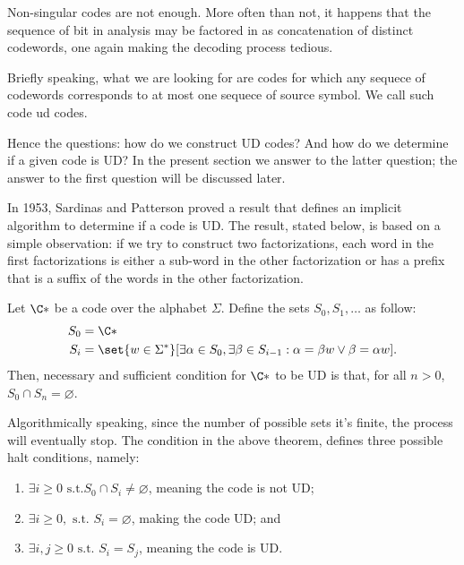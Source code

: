 \documentclass{subfiles}
\begin{document}
    Non-singular codes are not enough. 
        More often than not, it happens that the sequence of bit in analysis may be factored in
        as concatenation of distinct codewords, one again making the decoding process tedious. 

    Briefly speaking, what we are looking for are codes for which any sequece of codewords
        corresponds to at most one sequece of source symbol.
        We call such code \gls{ud} codes.
        
    Hence the questions: how do we construct UD codes?
        And how do we determine if a given code is UD? 
        In the present section we answer to the latter question;
        the answer to the first question will be discussed later.

    In 1953, Sardinas and Patterson proved a result that defines an implicit algorithm 
        to determine if a code is UD. The result, stated below, is based on a simple observation:
        if we try to construct two factorizations, each word in the first factorizations
        is either a sub-word in the other factorization or has a prefix that is a suffix of 
        the words in the other factorization.

    \begin{theorem*}
        Let \(\C*\) be a code over the alphabet \(\Sigma\).
        Define the sets \(S_{0}, S_{1}, \ldots\) as follow:
        \[\begin{aligned}
            S_{0} & = \C* \\ 
            S_{i} & = \set{w \in \Sigma^{*}}[\exists \alpha \in S_{0},
                \exists \beta \in S_{i - 1} : \alpha = \beta w \lor \beta = \alpha w].
        \end{aligned}\]
        Then, necessary and sufficient condition for \(\C*\) to be UD is that,
        for all \(n > 0\), \(S_{0} \cap S_{n} = \varnothing\).
    \end{theorem*}

    Algorithmically speaking, since the number of possible sets it's finite,
        the process will eventually stop. 
        The condition in the above theorem, defines three possible halt conditions,
        namely: 
        \begin{enumerate}
            \item \(\exists i \ge 0 \text{ s.t.} S_{0} \cap S_{i} \ne \varnothing\),
                meaning the code is not UD;
            \item \(\exists i \ge 0, \text{ s.t. } S_{i} = \varnothing\),
                making the code UD; and 
            \item \(\exists i, j \ge 0 \text{ s.t. } S_{i} = S_{j}\),
                meaning the code is UD.
        \end{enumerate}
\end{document}
